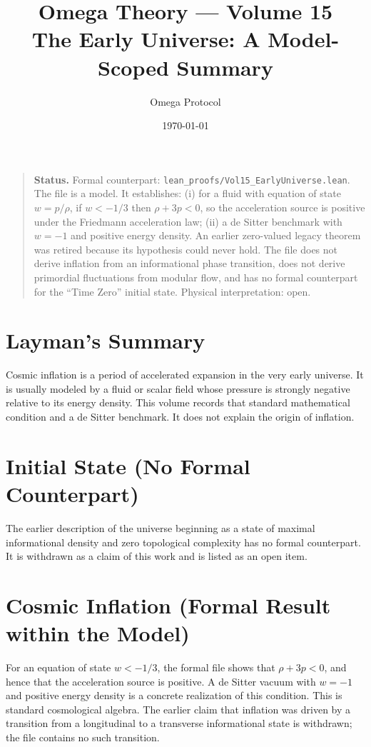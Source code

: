 \documentclass[11pt, a4paper]{article}
\title{Omega Theory --- Volume 15\\\Large The Early Universe: A Model-Scoped Summary}
\author{Omega Protocol}
\date{\today}
\begin{document}
\maketitle

\begin{quote}
\textbf{Status.} Formal counterpart: \texttt{lean\_proofs/Vol15\_EarlyUniverse.lean}. The file is a model. It establishes: (i) for a fluid with equation of state $w = p/\rho$, if $w < -1/3$ then $\rho + 3p < 0$, so the acceleration source is positive under the Friedmann acceleration law; (ii) a de Sitter benchmark with $w = -1$ and positive energy density. An earlier zero-valued legacy theorem was retired because its hypothesis could never hold. The file does not derive inflation from an informational phase transition, does not derive primordial fluctuations from modular flow, and has no formal counterpart for the ``Time Zero'' initial state. Physical interpretation: open.
\end{quote}

\section*{Layman's Summary}
Cosmic inflation is a period of accelerated expansion in the very early universe. It is usually modeled by a fluid or scalar field whose pressure is strongly negative relative to its energy density. This volume records that standard mathematical condition and a de Sitter benchmark. It does not explain the origin of inflation.

\section{Initial State (No Formal Counterpart)}
The earlier description of the universe beginning as a state of maximal informational density and zero topological complexity has no formal counterpart. It is withdrawn as a claim of this work and is listed as an open item.

\section{Cosmic Inflation (Formal Result within the Model)}
For an equation of state $w < -1/3$, the formal file shows that $\rho + 3p < 0$, and hence that the acceleration source is positive. A de Sitter vacuum with $w = -1$ and positive energy density is a concrete realization of this condition. This is standard cosmological algebra. The earlier claim that inflation was driven by a transition from a longitudinal to a transverse informational state is withdrawn; the file contains no such transition.
\end{document}
